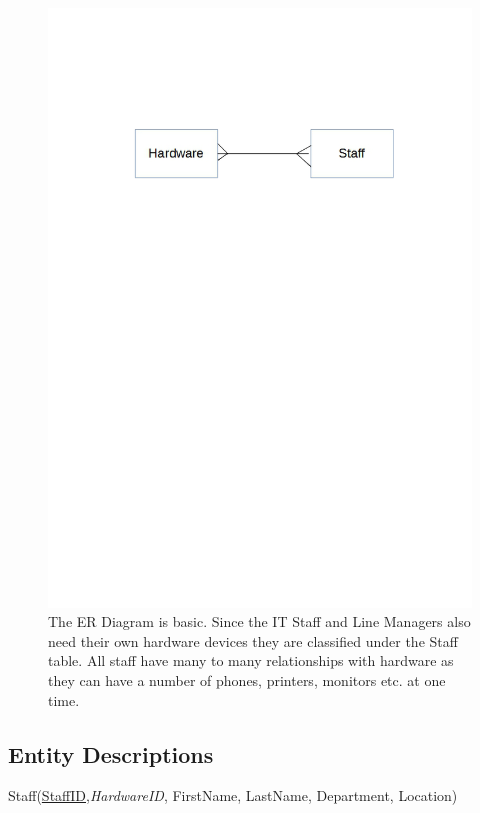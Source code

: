 \begin{figure}[H]
\hspace*{-2cm}
\vspace*{5cm}
\setlength{\abovecaptionskip}{-320pt plus 3pt minus 2pt}
\includegraphics[width=1.2\textwidth]{ERDiagram.png}
\caption{The ER Diagram is basic. Since the IT Staff and Line Managers also need their own hardware devices they are classified under the Staff table. All staff have many to many relationships with hardware as they can have a number of phones, printers, monitors etc. at one time.} \label{ER Diagram}
\end{figure}

\subsection{Entity Descriptions}

Staff(\underline{StaffID},\textit{HardwareID}, FirstName, LastName, Department, Location)

